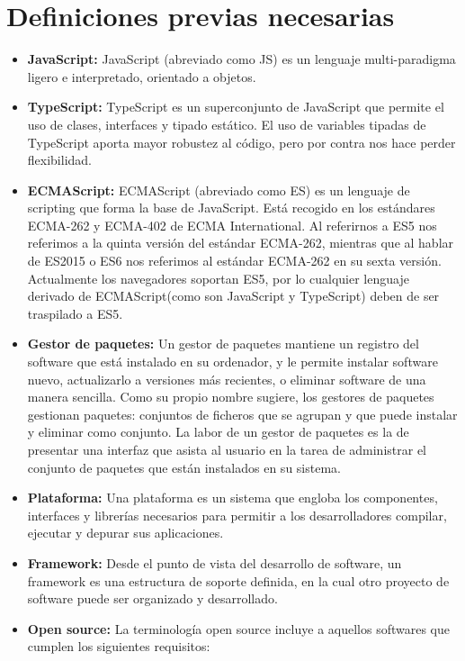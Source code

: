 \documentclass[openright,twoside,10pt]{book}
\begin{document}
    \section{Definiciones previas
    necesarias}\label{definiciones-previas-necesarias}
    
    \begin{itemize}
    \item
      \textbf{JavaScript:} JavaScript (abreviado como JS) es un lenguaje
      multi-paradigma ligero e interpretado, orientado a objetos.
    \item
      \textbf{TypeScript:} TypeScript es un superconjunto de JavaScript que
      permite el uso de clases, interfaces y tipado estático. El uso de
      variables tipadas de TypeScript aporta mayor robustez al código, pero
      por contra nos hace perder flexibilidad.
    \item
      \textbf{ECMAScript:} ECMAScript (abreviado como ES) es un lenguaje de
      scripting que forma la base de JavaScript. Está recogido en los
      estándares ECMA-262 y ECMA-402 de ECMA International. Al referirnos a
      ES5 nos referimos a la quinta versión del estándar ECMA-262, mientras
      que al hablar de ES2015 o ES6 nos referimos al estándar ECMA-262 en su
      sexta versión. Actualmente los navegadores soportan ES5, por lo
      cualquier lenguaje derivado de ECMAScript(como son JavaScript y
      TypeScript) deben de ser traspilado a ES5.
    \item
      \textbf{Gestor de paquetes:} Un gestor de paquetes mantiene un
      registro del software que está instalado en su ordenador, y le permite
      instalar software nuevo, actualizarlo a versiones más recientes, o
      eliminar software de una manera sencilla. Como su propio nombre
      sugiere, los gestores de paquetes gestionan paquetes: conjuntos de
      ficheros que se agrupan y que puede instalar y eliminar como conjunto.
      La labor de un gestor de paquetes es la de presentar una interfaz que
      asista al usuario en la tarea de administrar el conjunto de paquetes
      que están instalados en su sistema.
    \item
      \textbf{Plataforma:} Una plataforma es un sistema que engloba los
      componentes, interfaces y librerías necesarios para permitir a los
      desarrolladores compilar, ejecutar y depurar sus aplicaciones.
    \item
      \textbf{Framework:} Desde el punto de vista del desarrollo de
      software, un framework es una estructura de soporte definida, en la
      cual otro proyecto de software puede ser organizado y desarrollado.
    \item
      \textbf{Open source:} La terminología open source incluye a aquellos
      softwares que cumplen los siguientes requisitos:
    

\end{itemize}
\end{document}

